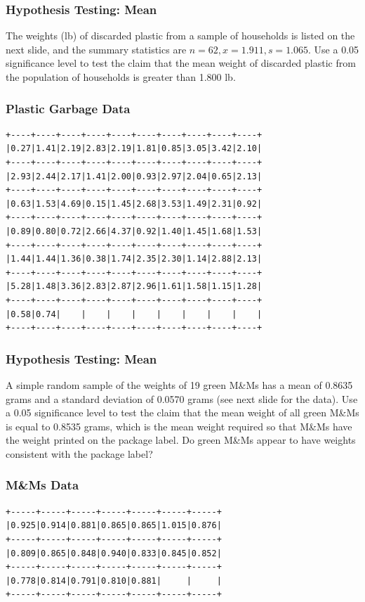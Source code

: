 \documentclass[xcolor=dvipsnames]{beamer}
\begin{document}
\begin{frame}
  \frametitle{Hypothesis Testing: Mean}
  {\ubung} The weights (lb) of discarded plastic from a
  sample of households is listed on the next slide, and
  the summary statistics are $n=62,x=1.911,s=1.065$.
  Use a 0.05 significance level to test the claim that
  the mean weight of discarded plastic from the
  population of households is greater than 1.800 lb.
\end{frame}

\begin{frame}[fragile]
  \frametitle{Plastic Garbage Data}
\begin{verbatim}
+----+----+----+----+----+----+----+----+----+----+
|0.27|1.41|2.19|2.83|2.19|1.81|0.85|3.05|3.42|2.10|
+----+----+----+----+----+----+----+----+----+----+
|2.93|2.44|2.17|1.41|2.00|0.93|2.97|2.04|0.65|2.13|
+----+----+----+----+----+----+----+----+----+----+
|0.63|1.53|4.69|0.15|1.45|2.68|3.53|1.49|2.31|0.92|
+----+----+----+----+----+----+----+----+----+----+
|0.89|0.80|0.72|2.66|4.37|0.92|1.40|1.45|1.68|1.53|
+----+----+----+----+----+----+----+----+----+----+
|1.44|1.44|1.36|0.38|1.74|2.35|2.30|1.14|2.88|2.13|
+----+----+----+----+----+----+----+----+----+----+
|5.28|1.48|3.36|2.83|2.87|2.96|1.61|1.58|1.15|1.28|
+----+----+----+----+----+----+----+----+----+----+
|0.58|0.74|    |    |    |    |    |    |    |    |
+----+----+----+----+----+----+----+----+----+----+
\end{verbatim}
\end{frame}

\begin{frame}
  \frametitle{Hypothesis Testing: Mean}
  {\ubung} A simple random sample of the weights of 19
  green M\&Ms has a mean of 0.8635 grams and a standard
  deviation of 0.0570 grams (see next slide for the
  data). Use a 0.05 significance level to test the
  claim that the mean weight of all green M\&Ms is
  equal to 0.8535 grams, which is the mean weight required
  so that M\&Ms have the weight printed on the package
  label. Do green M\&Ms appear to have weights
  consistent with the package label?
\end{frame}

\begin{frame}[fragile]
  \frametitle{M\&Ms Data}
\begin{verbatim}
+-----+-----+-----+-----+-----+-----+-----+
|0.925|0.914|0.881|0.865|0.865|1.015|0.876|
+-----+-----+-----+-----+-----+-----+-----+
|0.809|0.865|0.848|0.940|0.833|0.845|0.852|
+-----+-----+-----+-----+-----+-----+-----+
|0.778|0.814|0.791|0.810|0.881|     |     |
+-----+-----+-----+-----+-----+-----+-----+
\end{verbatim}
\end{frame}
\end{document}
